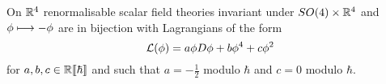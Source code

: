 \begin{corollary}
  On $\mathbb{R}^4$ renormalisable scalar field theories invariant under $SO(4) \times \mathbb{R}^4$ and $\phi \lmap -\phi$ are in bijection with Lagrangians of the form
  \begin{equation}\LL (\phi) = a \phi D \phi + b \phi^4 + c \phi^2\end{equation}
  for $a,b,c \in \mathbb{R}\llbracket\hbar \rrbracket$ and such that $a = - \frac{1}{2}$ modulo $\hbar$ and $c = 0$ modulo $\hbar$.
\end{corollary}

\newpage
